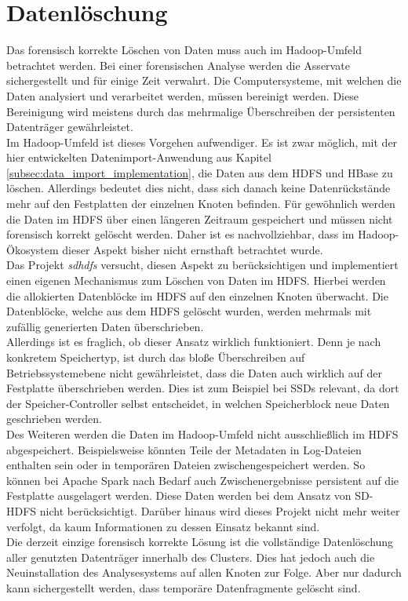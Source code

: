 \section{Datenlöschung}
Das forensisch korrekte Löschen von Daten muss auch im Hadoop-Umfeld betrachtet werden. Bei einer forensischen Analyse werden die Asservate sichergestellt und für einige Zeit verwahrt. Die Computersysteme, mit welchen die Daten analysiert und verarbeitet werden, müssen bereinigt werden. Diese Bereinigung wird meistens durch das mehrmalige Überschreiben der persistenten Datenträger gewährleistet.\\
 Im Hadoop-Umfeld ist dieses Vorgehen aufwendiger. Es ist zwar möglich, mit der hier entwickelten Datenimport-Anwendung aus Kapitel \ref{subsec:data_import_implementation}, die Daten aus dem HDFS und HBase zu löschen. Allerdings bedeutet dies nicht, dass sich danach keine Datenrückstände mehr auf den Festplatten der einzelnen Knoten befinden.
Für gewöhnlich werden die Daten im HDFS über einen längeren Zeitraum gespeichert und müssen nicht forensisch korrekt gelöscht werden. Daher ist es nachvollziehbar, dass im Hadoop-Ökosystem dieser Aspekt bisher nicht ernsthaft betrachtet wurde.\\

\noindent
Das Projekt \textit{\gls{sdhdfs}} versucht, diesen Aspekt zu berücksichtigen und implementiert einen eigenen Mechanismus zum Löschen von Daten im HDFS.\cite{sd_hdfs} Hierbei werden die allokierten Datenblöcke im HDFS auf den einzelnen Knoten überwacht. Die Datenblöcke, welche aus dem HDFS gelöscht wurden, werden mehrmals mit zufällig generierten Daten überschrieben.\\ 
Allerdings ist es fraglich, ob dieser Ansatz wirklich funktioniert. Denn je nach konkretem Speichertyp, ist durch das bloße Überschreiben auf Betriebssystemebene nicht gewährleistet, dass die Daten auch wirklich auf der Festplatte überschrieben werden. 
Dies ist zum Beispiel bei SSDs relevant, da dort der Speicher-Controller selbst entscheidet, in welchen Speicherblock neue Daten geschrieben werden.\\ 
Des Weiteren werden die Daten im Hadoop-Umfeld nicht ausschließlich im HDFS abgespeichert. Beispielsweise könnten Teile der Metadaten in Log-Dateien enthalten sein oder in temporären Dateien zwischengespeichert werden. 
So können bei Apache Spark nach Bedarf auch Zwischenergebnisse persistent auf die Festplatte ausgelagert werden.\cite{spark_rdd} Diese Daten werden bei dem Ansatz von SD-HDFS nicht berücksichtigt. Darüber hinaus wird dieses Projekt nicht mehr weiter verfolgt, da kaum Informationen zu dessen Einsatz bekannt sind.\\

\noindent
Die  derzeit einzige forensisch korrekte Lösung ist die vollständige Datenlöschung aller genutzten Datenträger innerhalb des Clusters. Dies hat jedoch auch die Neuinstallation des Analysesystems auf allen Knoten zur Folge. Aber nur dadurch kann sichergestellt werden, dass temporäre Datenfragmente gelöscht sind.  